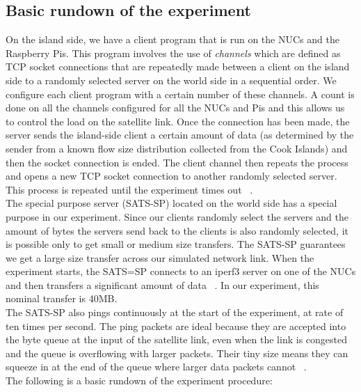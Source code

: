 \subsection{Basic rundown of the experiment}
On the island side, we have a client program that is run on the NUCs and the Raspberry Pis. This program involves the use of \emph{channels} which are defined as TCP socket connections that are repeatedly made between a client on the island side to a randomly selected server on the world side in a sequential order. We configure each client program with a certain number of these channels. A count is done on all the channels configured for all the NUCs and Pis and this allows us to control the load on the satellite link. Once the connection has been made, the server sends the island-side client a certain amount of data (as determined by the sender from a known flow size distribution collected from the Cook Islands) and then the socket connection is ended. The client channel then repeats the process and opens a new TCP socket connection to another randomly selected server. This process is repeated until the experiment times out ~\cite{21}. \\

The special purpose server (SATS-SP) located on the world side has a special purpose in our experiment. Since our clients randomly select the servers and the amount of bytes the servers send back to the clients is also randomly selected, it is possible only to get small or medium size transfers. The SATS-SP guarantees we get a large size transfer across our simulated network link. When the experiment starts, the SATS=SP connects to an iperf3 server on one of the NUCs and then transfers a significant amount of data ~\cite{21}. In our experiment, this nominal transfer is 40MB. \\

The SATS-SP also pings continuously at the start of the experiment, at rate of ten times per second. The ping packets are ideal because they are accepted into the byte queue at the input of the satellite link, even when the link is congested and the queue is overflowing with larger packets. Their tiny size means they can squeeze in at the end of the queue where larger data packets cannot ~\cite{21}.\\

The following is a basic rundown of the experiment procedure:

